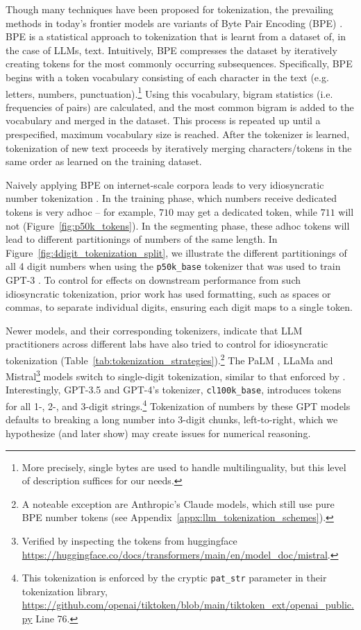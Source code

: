 \documentclass{article}
\theoremstyle{plain}
\theoremstyle{definition}
\theoremstyle{remark}
\begin{document}
Though many techniques have been proposed for tokenization, the prevailing methods in today's frontier models are variants of Byte Pair Encoding (BPE) \citep{gage1994bpe, sennrich2016bpe}. BPE is a statistical approach to tokenization that is learnt from a dataset of, in the case of LLMs, text. Intuitively, BPE compresses the dataset by iteratively creating tokens for the most commonly occurring subsequences. Specifically, BPE begins with a token vocabulary consisting of each character in the text (e.g. letters, numbers, punctuation).\footnote{More precisely, single bytes are used to handle multilinguality, but this level of description suffices for our needs.} Using this vocabulary, bigram statistics (i.e. frequencies of pairs) are calculated, and the most common bigram is added to the vocabulary and merged in the dataset. This process is repeated up until a prespecified, maximum vocabulary size is reached. After the tokenizer is learned, tokenization of new text proceeds by iteratively merging characters/tokens in the same order as learned on the training dataset.

Naively applying BPE on internet-scale corpora leads to very idiosyncratic number tokenization \cite{teknium2023bpe_weird}. In the training phase, which numbers receive dedicated tokens is very adhoc -- for example, $710$ may get a dedicated token, while $711$ will not (Figure~\ref{fig:p50k_tokens}). In the segmenting phase, these adhoc tokens will lead to different partitionings of numbers of the same length. In Figure~\ref{fig:4digit_tokenization_split}, we illustrate the different partitionings of all 4 digit numbers when using the \texttt{p50k\_base} tokenizer that was used to train GPT-3 \cite{brown2020gpt3}. To control for effects on downstream performance from such idiosyncratic tokenization, prior work \citep{nye2021scratchpad, zhou2022algo_prompting} has used formatting, such as spaces or commas, to separate individual digits, ensuring each digit maps to a single token.

Newer models, and their corresponding tokenizers, indicate that LLM practitioners across different labs have also tried to control for idiosyncratic tokenization (Table~\ref{tab:tokenization_strategies}).\footnote{A noteable exception are Anthropic's Claude models, which still use pure BPE number tokens (see Appendix~\ref{appx:llm_tokenization_schemes}).} The PaLM \cite{chowdhery2022palm}, LLaMa \cite{touvron2023llama1} and Mistral\footnote{Verified by inspecting the tokens from huggingface \url{https://huggingface.co/docs/transformers/main/en/model_doc/mistral}.} \cite{jiang2023mistral} models switch to single-digit tokenization, similar to that enforced by \citet{nye2021scratchpad}. Interestingly, GPT-3.5 and GPT-4's tokenizer, \texttt{cl100k\_base}, introduces tokens for all 1-, 2-, and 3-digit strings.\footnote{This tokenization is enforced by the cryptic \texttt{pat\_str} parameter in their tokenization library, \url{https://github.com/openai/tiktoken/blob/main/tiktoken_ext/openai_public.py} Line 76.} Tokenization of numbers by these GPT models defaults to breaking a long number into 3-digit chunks, left-to-right, which we hypothesize (and later show) may create issues for numerical reasoning.
\end{document}
